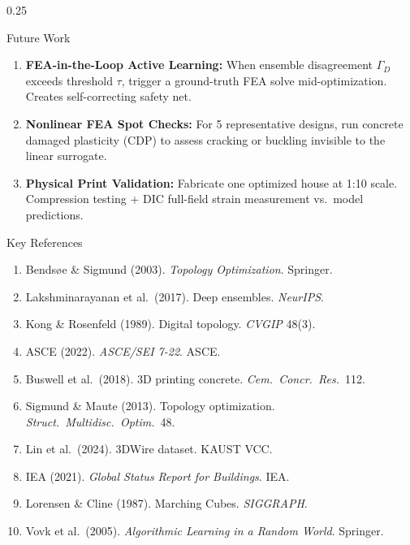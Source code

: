 \documentclass[final]{beamer}
\newcommand{\bodytext}{\fontsize{13.5}{16}\selectfont\color{textdark}\justifying}
\begin{document}
\begin{frame}[t]
\begin{columns}[T]
\begin{column}{0.25\textwidth}
\begin{sectionbox}{Future Work}
\bodytext

\begin{enumerate}[leftmargin=*, itemsep=3pt, label={\color{accentteal}\bfseries\arabic*.}]
    \item \textbf{FEA-in-the-Loop Active Learning:} When ensemble disagreement $\Gamma_D$ exceeds threshold $\tau$, trigger a ground-truth FEA solve mid-optimization. Creates self-correcting safety net.
    \item \textbf{Nonlinear FEA Spot Checks:} For 5 representative designs, run concrete damaged plasticity (CDP) to assess cracking or buckling invisible to the linear surrogate.
    \item \textbf{Physical Print Validation:} Fabricate one optimized house at 1:10 scale. Compression testing + DIC full-field strain measurement vs.\ model predictions.
\end{enumerate}
\end{sectionbox}

\vspace{4pt}

\begin{sectionbox}{Key References}
{\fontsize{11}{13}\selectfont\color{textdark}

\begin{enumerate}[leftmargin=*, itemsep=1pt, label={\arabic*.}]
    \item Bends{\o}e \& Sigmund (2003). \textit{Topology Optimization}. Springer.
    \item Lakshminarayanan et al.\ (2017). Deep ensembles. \textit{NeurIPS}.
    \item Kong \& Rosenfeld (1989). Digital topology. \textit{CVGIP} 48(3).
    \item ASCE (2022). \textit{ASCE/SEI 7-22}. ASCE.
    \item Buswell et al.\ (2018). 3D printing concrete. \textit{Cem.\ Concr.\ Res.}\ 112.
    \item Sigmund \& Maute (2013). Topology optimization. \textit{Struct.\ Multidisc.\ Optim.}\ 48.
    \item Lin et al.\ (2024). 3DWire dataset. KAUST VCC.
    \item IEA (2021). \textit{Global Status Report for Buildings}. IEA.
    \item Lorensen \& Cline (1987). Marching Cubes. \textit{SIGGRAPH}.
    \item Vovk et al.\ (2005). \textit{Algorithmic Learning in a Random World}. Springer.
\end{enumerate}
}
\end{sectionbox}

\end{column}

\end{columns}
\end{frame}
\end{document}
